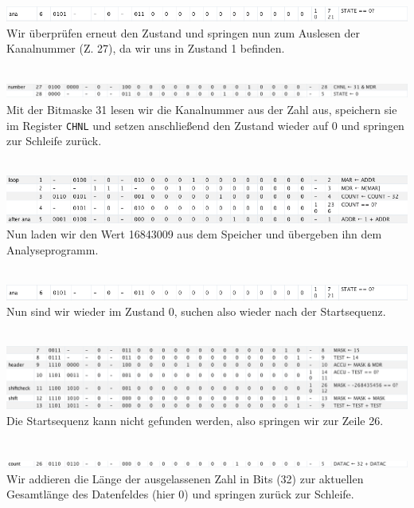 \documentclass[12pt,titlepage]{article}
\begin{document}
\leavevmode \\
\includegraphics[width=16cm]{listing/row6.png}
\leavevmode \\
Wir überprüfen erneut den Zustand und springen nun zum Auslesen der Kanalnummer (Z. 27), da wir uns in Zustand 1 befinden.

\leavevmode \\
\includegraphics[width=16cm]{listing/row27-28.png}
\leavevmode \\
Mit der Bitmaske 31 lesen wir die Kanalnummer aus der Zahl aus, speichern sie im Register \texttt{CHNL}
und setzen anschließend den Zustand wieder auf 0 und springen zur Schleife
zurück.

\leavevmode \\
\includegraphics[width=16cm]{listing/row1-5.png}
\leavevmode \\
Nun laden wir den Wert 16843009 aus dem Speicher und übergeben ihn dem Analyseprogramm.

\leavevmode \\
\includegraphics[width=16cm]{listing/row6.png}
\leavevmode \\
Nun sind wir wieder im Zustand 0, suchen also wieder nach der Startsequenz.

\leavevmode \\
\includegraphics[width=16cm]{listing/row7-13.png}
\leavevmode \\
Die Startsequenz kann nicht gefunden werden, also springen wir zur Zeile 26.

\leavevmode \\
\includegraphics[width=16cm]{listing/row26.png}
\leavevmode \\
Wir addieren die Länge der ausgelassenen Zahl in Bits (32) zur aktuellen Gesamtlänge des Datenfeldes (hier 0) und
springen zurück zur Schleife.
\end{document}
